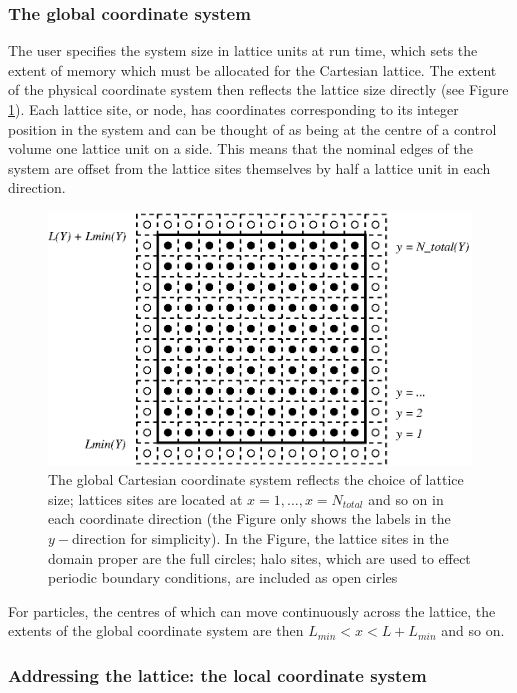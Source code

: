 \subsubsection{The global coordinate system}

The user specifies the system size in lattice units at run time,
which sets the extent of memory which must be allocated for the
Cartesian lattice. The extent of the physical coordinate system
then reflects the lattice size directly (see Figure \ref{fig_c1}). 
Each lattice site, or node,  has coordinates corresponding to its
integer position in the system and can be thought of as being
at the centre of a control volume one lattice unit on a side.
This means that the nominal edges of the
system are offset from the lattice sites themselves by half a
lattice unit in each direction.


\begin{figure}[h]
\begin{center}
\includegraphics{xfig/fig_c1.eps}
\end{center}
\caption{The global Cartesian coordinate system reflects the choice
of lattice size; lattices sites are located at
$x=1, \ldots, x = N_{total}$ and so on in each coordinate direction
(the Figure only shows the labels in the $y-$direction for simplicity).
In the Figure, the lattice sites in the domain proper are the full
circles; halo sites, which are used to effect periodic boundary
conditions, are included as open cirles}
\label{fig_c1}
\end{figure}

For particles, the centres of which can move continuously across the
lattice, the extents of the global coordinate system are then
$L_{min} < x < L + L_{min}$ and so on.

\subsubsection{Addressing the lattice: the local coordinate system}


